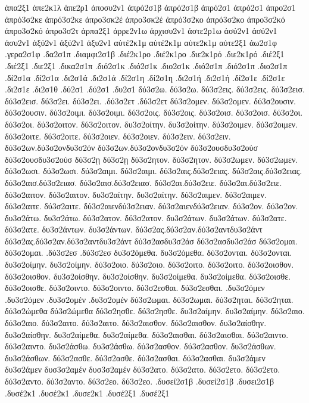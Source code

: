 {ἁπα2ξ1
ἀπε2κ1λ
ἁπε2ρ1
ἀποσυ2ν1
ἀπρό2σ1β  ἀπρό2σ1β
ἀπρό2σ1  ἀπρό2σ1
ἀπρο2σ1
ἀπρό3σ2κε  ἀπρό3σ2κε
ἀπρο3σκ2έ  ἀπρο3σκ2έ
ἀπρό3σ2κο  ἀπρό3σ2κο
ἀπρο3σ2κό  ἀπρο3σ2κό
ἀπρο3σ2τ
ἁρπα2ξ1
ἀρρε2ν1ω
ἀρχισυ2ν1
ἀστε2ρ1ω
ἀσύ2ν1  ἀσύ2ν1
ἀσυ2ν1
ἀξύ2ν1  ἀξύ2ν1
ἀξυ2ν1
αὐτέ2κ1μ  αὐτέ2κ1μ
αὐτε2κ1μ
αὐτε2ξ1
ἀω2σ1φ
.γερα2σ1φ
.δα2σ1π
.διαμφι2σ1β
.διέ2κ1ρο  .διέ2κ1ρο
.διε2κ1ρό  .διε2κ1ρό
.διέ2ξ1  .διέ2ξ1
.διε2ξ1
.δικα2σ1π
.διό2σ1κ  .διό2σ1κ
.διο2σ1κ
.διό2σ1π  .διό2σ1π
.διο2σ1π
.δί2σ1α  .δί2σ1α
.δι2σ1ά  .δι2σ1ά
.δί2σ1η  .δί2σ1η
.δι2σ1ή  .δι2σ1ή
.δί2σ1ε  .δί2σ1ε
.δι2σ1ε
.δι2σ1θ
.δύ2σ1  .δύ2σ1
.δυ2σ1
δύ3σ2ω.  δύ3σ2ω.
δύ3σ2εις.  δύ3σ2εις.
δύ3σ2εισ.  δύ3σ2εισ.
δύ3σ2ει.  δύ3σ2ει.
.δύ3σ2ετ  .δύ3σ2ετ
δύ3σ2ομεν.  δύ3σ2ομεν.
δύ3σ2ουσιν.  δύ3σ2ουσιν.
δύ3σ2οιμι.  δύ3σ2οιμι.
δύ3σ2οις.  δύ3σ2οις.
δύ3σ2οισ.  δύ3σ2οισ.
δύ3σ2οι.  δύ3σ2οι.
δύ3σ2οιτον.  δύ3σ2οιτον.
δυ3σ2οίτην.  δυ3σ2οίτην.
δύ3σ2οιμεν.  δύ3σ2οιμεν.
δύ3σ2οιτε.  δύ3σ2οιτε.
δύ3σ2οιεν.  δύ3σ2οιεν.
δύ3σ2ειν.  δύ3σ2ειν.
δύ3σ2ων.δύ3σ2ονδυ3σ2όν  δύ3σ2ων.δύ3σ2ονδυ3σ2όν
δύ3σ2ουσδυ3σ2ούσ  δύ3σ2ουσδυ3σ2ούσ
δύ3σ2ῃ  δύ3σ2ῃ
δύ3σ2ητον.  δύ3σ2ητον.
δύ3σ2ωμεν.  δύ3σ2ωμεν.
δύ3σ2ωσι.  δύ3σ2ωσι.
δύ3σ2αιμι.  δύ3σ2αιμι.
δύ3σ2αις.δύ3σ2ειας.  δύ3σ2αις.δύ3σ2ειας.
δύ3σ2αισ.δύ3σ2ειασ.  δύ3σ2αισ.δύ3σ2ειασ.
δύ3σ2αι.δύ3σ2ειε.  δύ3σ2αι.δύ3σ2ειε.
δύ3σ2αιτον.  δύ3σ2αιτον.
δυ3σ2αίτην.  δυ3σ2αίτην.
δύ3σ2αιμεν.  δύ3σ2αιμεν.
δύ3σ2αιτε.  δύ3σ2αιτε.
δύ3σ2αιενδύ3σ2ειαν.  δύ3σ2αιενδύ3σ2ειαν.
δύ3σ2ον.  δύ3σ2ον.
δυ3σ2άτω.  δυ3σ2άτω.
δύ3σ2ατον.  δύ3σ2ατον.
δυ3σ2άτων.  δυ3σ2άτων.
δύ3σ2ατε.  δύ3σ2ατε.
δυ3σ2άντων.  δυ3σ2άντων.
δύ3σ2ας.δύ3σ2αν.δύ3σ2αντδυ3σ2άντ  δύ3σ2ας.δύ3σ2αν.δύ3σ2αντδυ3σ2άντ
δύ3σ2ασδυ3σ2άσ  δύ3σ2ασδυ3σ2άσ
δύ3σ2ομαι.  δύ3σ2ομαι.
.δύ3σ2εσ  .δύ3σ2εσ
δυ3σ2όμεθα.  δυ3σ2όμεθα.
δύ3σ2ονται.  δύ3σ2ονται.
δυ3σ2οίμην.  δυ3σ2οίμην.
δύ3σ2οιο.  δύ3σ2οιο.
δύ3σ2οιτο.  δύ3σ2οιτο.
δύ3σ2οισθον.  δύ3σ2οισθον.
δυ3σ2οίσθην.  δυ3σ2οίσθην.
δυ3σ2οίμεθα.  δυ3σ2οίμεθα.
δύ3σ2οισθε.  δύ3σ2οισθε.
δύ3σ2οιντο.  δύ3σ2οιντο.
δύ3σ2εσθαι.  δύ3σ2εσθαι.
.δυ3σ2όμεν  .δυ3σ2όμεν
.δυ3σ2ομέν  .δυ3σ2ομέν
δύ3σ2ωμαι.  δύ3σ2ωμαι.
δύ3σ2ηται.  δύ3σ2ηται.
δύ3σ2ώμεθα  δύ3σ2ώμεθα
δύ3σ2ησθε.  δύ3σ2ησθε.
δυ3σ2αίμην.  δυ3σ2αίμην.
δύ3σ2αιο.  δύ3σ2αιο.
δύ3σ2αιτο.  δύ3σ2αιτο.
δύ3σ2αισθον.  δύ3σ2αισθον.
δυ3σ2αίσθην.  δυ3σ2αίσθην.
δυ3σ2αίμεθα.  δυ3σ2αίμεθα.
δύ3σ2αισθαι.  δύ3σ2αισθαι.
δύ3σ2αιντο.  δύ3σ2αιντο.
δυ3σ2άσθω.  δυ3σ2άσθω.
δύ3σ2ασθον.  δύ3σ2ασθον.
δυ3σ2άσθων.  δυ3σ2άσθων.
δύ3σ2ασθε.  δύ3σ2ασθε.
δύ3σ2ασθαι.  δύ3σ2ασθαι.
δυ3σ2άμεν  δυ3σ2άμεν
δυσ3σ2αμέν  δυσ3σ2αμέν
δύ3σ2ατο.  δύ3σ2ατο.
δύ3σ2ετο.  δύ3σ2ετο.
δύ3σ2αντο.  δύ3σ2αντο.
δύ3σ2εο.  δύ3σ2εο.
.δυσεί2σ1β  .δυσεί2σ1β
.δυσει2σ1β
.δυσέ2κ1  .δυσέ2κ1
.δυσε2κ1
.δυσέ2ξ1  .δυσέ2ξ1
}
